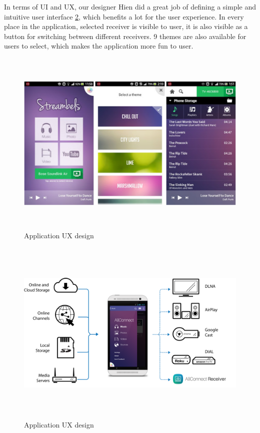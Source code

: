 In terms of UI and UX, our designer Hien did a great job of defining a simple
and intuitive user interface \ref{chart5}, which benefits a lot for the user
experience.
In every place in the application, selected receiver is visible to user, it is also
visible as a button for switching between different receivers. 9 themes are also
available for users to select, which makes the application more fun to user.
\begin{figure}[htb]
\centering \includegraphics[height=9cm]{charts/streambels_ui}
\caption{Application UX design \label{chart5}}
\end{figure}

\begin{figure}[htb]
\centering \includegraphics[height=9cm]{charts/allconnect-app}
\caption{Application UX design \label{chart5}}
\end{figure}

